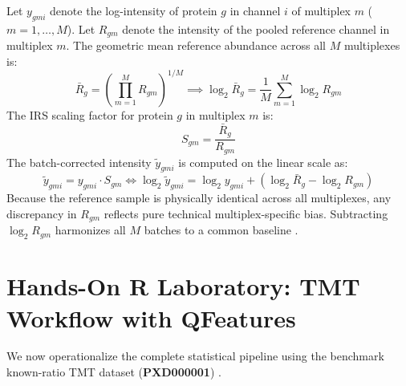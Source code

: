 \documentclass[11pt,oneside]{book}
\begin{document}
Let $y_{gmi}$ denote the log-intensity of protein $g$ in channel $i$ of multiplex $m$ ($m = 1, \dots, M$). Let $R_{gm}$ denote the intensity of the pooled reference channel in multiplex $m$. The geometric mean reference abundance across all $M$ multiplexes is:
\begin{equation}
\bar{R}_g = \left( \prod_{m=1}^M R_{gm} \right)^{1/M} \implies \log_2 \bar{R}_g = \frac{1}{M} \sum_{m=1}^M \log_2 R_{gm}
\label{eq:geometric_mean_ref}
\end{equation}
The IRS scaling factor for protein $g$ in multiplex $m$ is:
\begin{equation}
S_{gm} = \frac{\bar{R}_g}{R_{gm}}
\label{eq:irs_scaling_factor}
\end{equation}
The batch-corrected intensity $\tilde{y}_{gmi}$ is computed on the linear scale as:
\begin{equation}
\tilde{y}_{gmi} = y_{gmi} \cdot S_{gm} \iff \log_2 \tilde{y}_{gmi} = \log_2 y_{gmi} + \left( \log_2 \bar{R}_g - \log_2 R_{gm} \right)
\label{eq:irs_linear_transform}
\end{equation}
Because the reference sample is physically identical across all multiplexes, any discrepancy in $R_{gm}$ reflects pure technical multiplex-specific bias. Subtracting $\log_2 R_{gm}$ harmonizes all $M$ batches to a common baseline \cite{plubell2017extended}.

\section{Hands-On R Laboratory: TMT Workflow with QFeatures}

We now operationalize the complete statistical pipeline using the benchmark known-ratio TMT dataset (\textbf{PXD000001}) \cite{gatto2023qfeatures}.
\end{document}
